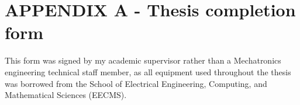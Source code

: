 \section*{APPENDIX A - Thesis completion form}
This form was signed by my academic supervisor rather than a Mechatronics engineering technical staff member,
as all equipment used throughout the thesis was borrowed from the School of Electrical Engineering, Computing, and
Mathematical Sciences (EECMS).

\cleardoublepage

